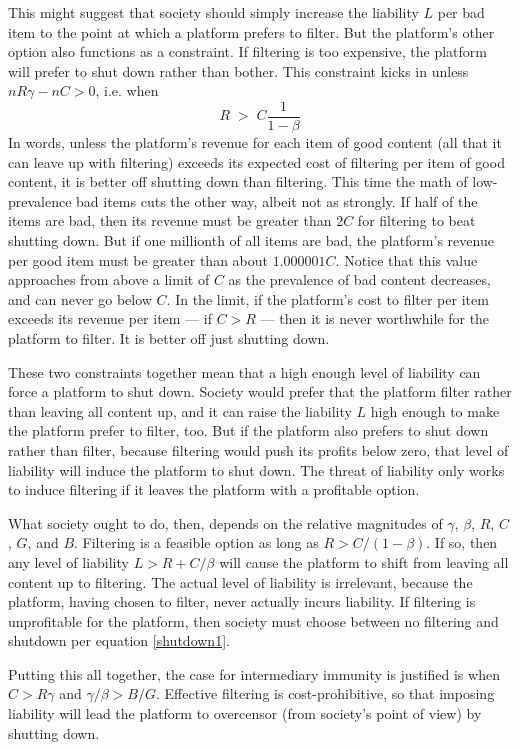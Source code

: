 \documentclass{article}
\begin{document}
This might suggest that society should simply increase the liability $L$
per bad item to the point at which a platform prefers to filter. But the platform's other option also functions as a constraint. If filtering is too expensive, the platform will prefer to shut down rather than bother. This constraint kicks in unless $nR\gamma - nC > 0$, i.e. when 
\begin{equation}
\label{shutdown2}
R \;>\; C\frac{1}{1 - \beta}
\end{equation}
In words, unless the platform's revenue for each item of good content (all that it can leave up with filtering) exceeds its expected cost of filtering per item of good content, it is better off shutting down than filtering. This time the math of low-prevalence bad items cuts the other way, albeit not as strongly. If half of the items are bad, then its revenue must be greater than $2C$ for filtering to beat shutting down. But if one millionth of all items are bad, the platform's revenue per good item must be greater than about $1.000001C$. Notice that this value approaches from above a limit of $C$ as the prevalence of bad content decreases, and can never go below $C$. In the limit, if the platform's cost to filter per item exceeds its revenue per item --- if $C > R$ --- then it is never worthwhile for the platform to filter. It is better off just shutting down.

These two constraints together mean that a high enough level of liability can force a platform to shut down.  Society would prefer that the platform filter rather than leaving all content up, and it can raise the liability $L$ high enough to make the platform prefer to filter, too. But if the platform also prefers to shut down rather than filter, because filtering would push its profits below zero, that level of liability will induce the platform to shut down. The threat of liability only works to induce filtering if it leaves the platform with a profitable option. 

What society ought to do, then, depends on the relative magnitudes of $\gamma$, $\beta$, $R$, $C$, $G$, and $B$. Filtering is a feasible option as long as $R > C/(1 - \beta)$. If so, then any level of liability $L > R + C/\beta$ will cause the platform to shift from leaving all content up to filtering. The actual level of liability is irrelevant, because the platform, having chosen to filter, never actually incurs liability.  If filtering is unprofitable for the platform, then society must choose between no filtering and shutdown per equation \ref{shutdown1}. 

Putting this all together, the case for intermediary immunity is justified is when $C > R\gamma$ and $\gamma/\beta > B/G$. Effective filtering is cost-prohibitive, so that imposing liability will lead the platform to overcensor (from society's point of view) by shutting down.
\end{document}
